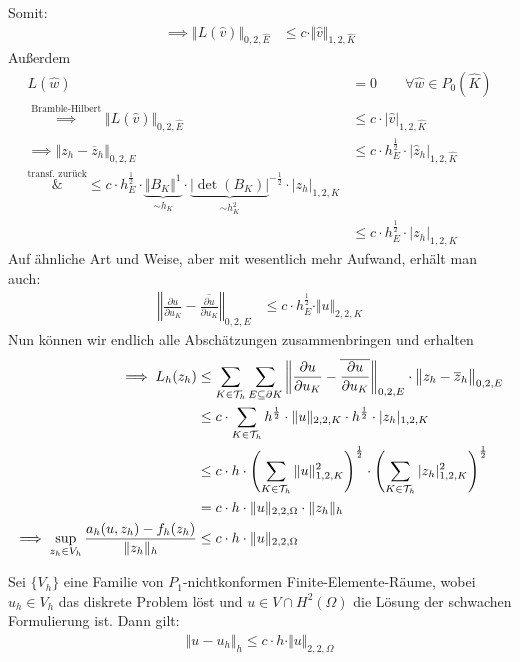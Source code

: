 Somit:
\begin{align*}
	\implies
	\big\Vert L(\hat{v})\big\Vert_{0,2,\hat{E}}
	&\leq c\cdot\Vert\hat{v}\Vert_{1,2,\hat{K}}
\end{align*}
Außerdem
\begin{align*}
	L(\hat{w})&=0\qquad\forall\hat{w}\in P_0(\hat{K})\\
	\overset{\text{Bramble-Hilbert}}{\implies}
	\big\Vert L(\hat{v})\big\Vert_{0,2,\hat{E}}
	&\leq
	c\cdot|\hat{v}|_{1,2,\hat{K}}\\
	\implies
	\big\Vert z_h-\overline{z}_h\big\Vert_{0,2,E}
	&\leq c\cdot h_E^{\frac{1}{2}}\cdot\big|\hat{z}_h\big|_{1,2,\hat{K}}\\
	\overset{\text{transf. zurück}}&{\leq}
	c\cdot h_E^{\frac{1}{2}}\cdot\underbrace{\Vert B_K\Vert^1}_{\sim h_K}\cdot{\underbrace{\big|\det(B_K)\big|}_{\sim h_K^2}}^{-\frac{1}{2}}\cdot|z_h|_{1,2,K}\\
	&\leq
	c\cdot h_E^{\frac{1}{2}}\cdot|z_h|_{1,2,K}
\end{align*}
Auf ähnliche Art und Weise, aber mit wesentlich mehr Aufwand, erhält man auch:
\begin{align*}
	\left\Vert\frac{\partial u}{\partial u_K}-\overline{\frac{\partial u}{\partial u_K}}\right\Vert_{0,2,E}
	&\leq c\cdot h_E^{\frac{1}{2}}\cdot\Vert u\Vert_{2,2,K}
\end{align*}
Nun können wir endlich alle Abschätzungen zusammenbringen und erhalten
\begin{align*}
	\implies
	L_h(z_h)
	&\leq
	\sum\limits_{K\in\mathcal{T}_h}\sum\limits_{E\subseteq\partial K}\left\Vert\frac{\partial u}{\partial u_K}-\overline{\frac{\partial u}{\partial u_K}}\right\Vert_{0,2,E}\cdot\big\Vert z_h-\overline{z}_h\big\Vert_{0,2,E}\\
	&\leq
	c\cdot\sum\limits_{K\in\mathcal{T}_h} h^{\frac{1}{2}}\cdot\Vert u\Vert_{2,2,K}\cdot h^{\frac{1}{2}}\cdot|z_h|_{1,2,K}\\
	&\leq
	c\cdot h\cdot\left(\sum\limits_{K\in\mathcal{T}_h}\Vert u\Vert^2_{1,2,K}\right)^{\frac{1}{2}}\cdot\left(\sum\limits_{K\in\mathcal{T}_h}|z_h|_{1,2,K}^2\right)^{\frac{1}{2}}\\
	&=c\cdot h\cdot \Vert u\Vert_{2,2,\Omega}\cdot\Vert z_h\Vert_h\\
	\implies
	\sup\limits_{z_h\in V_h}\frac{a_h(u, z_h)-f_h(z_h)}{\Vert z_h\Vert_h}
	&\leq c\cdot h\cdot\Vert u\Vert_{2,2,\Omega}
\end{align*}

\begin{theorem}\label{theorem5.2}
	Sei $\lbrace V_h\rbrace$ eine Familie von $P_1$-nichtkonformen Finite-Elemente-Räume, wobei $u_h\in V_h$ das diskrete Problem löst und $u\in V\cap H^2(\Omega)$ die Lösung der schwachen Formulierung ist. Dann gilt:
	\begin{align*}
		\big\Vert u-u_h\big\Vert_h\leq c\cdot h\cdot\Vert u\Vert_{2,2,\Omega}
	\end{align*}
\end{theorem}

